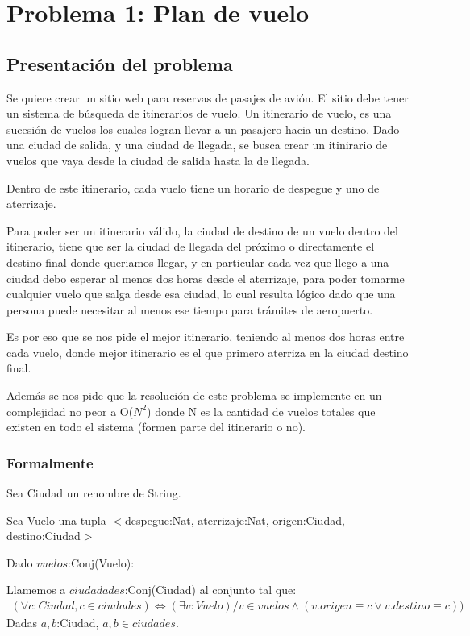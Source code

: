 \section{Problema 1: Plan de vuelo}

\subsection{Presentación del problema}

Se quiere crear un sitio web para reservas de pasajes de avi\'on. El sitio debe tener un sistema de b\'usqueda de itinerarios de vuelo. Un itinerario de vuelo, es una sucesi\'on de vuelos los cuales logran llevar a un pasajero hacia un destino. Dado una ciudad de salida, y una ciudad de llegada, se busca crear un itinirario de vuelos que vaya desde la ciudad de salida hasta la de llegada.

Dentro de este itinerario, cada vuelo tiene un horario de despegue y uno de aterrizaje. 

Para poder ser un itinerario v\'alido, la ciudad de destino de un vuelo dentro del itinerario, tiene que ser la ciudad de llegada del pr\'oximo o directamente el destino final donde queriamos llegar, y en particular cada vez que llego a una ciudad debo esperar al menos dos horas desde el aterrizaje, para poder tomarme cualquier vuelo que salga desde esa ciudad, lo cual resulta l\'ogico dado que una persona puede necesitar al menos ese tiempo para tr\'amites de aeropuerto.

Es por eso que se nos pide el mejor itinerario, teniendo al menos dos horas entre cada vuelo, donde mejor itinerario es el que primero aterriza en la ciudad destino final.

Adem\'as se nos pide que la resoluci\'on de este problema se implemente en un complejidad no peor a O($N^{2}$) donde N es la cantidad de vuelos totales que existen en todo el sistema (formen parte del itinerario o no).

\newpage
\subsubsection{Formalmente}


Sea Ciudad un renombre de String.

Sea Vuelo una tupla $<$despegue:Nat, aterrizaje:Nat, origen:Ciudad, destino:Ciudad$>$

Dado $vuelos$:Conj(Vuelo):

Llamemos a $ciudadades$:Conj(Ciudad) al conjunto tal que:
\begin{align*}
(\forall c:Ciudad, c \in ciudades)  \Leftrightarrow (\exists v:Vuelo)/ v \in vuelos \wedge (v.origen \equiv c \vee v.destino \equiv c))
\end{align*}
Dadas $a,b$:Ciudad, $a,b \in ciudades$. 

